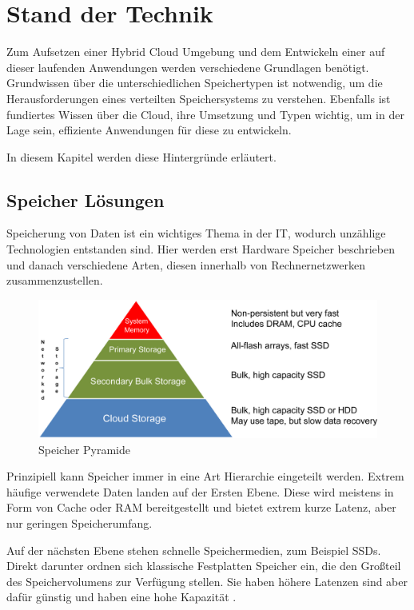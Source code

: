 \chapter{Stand der Technik}\label{ch:background}

Zum Aufsetzen einer Hybrid Cloud Umgebung und dem Entwickeln einer auf dieser laufenden Anwendungen werden verschiedene Grundlagen benötigt. Grundwissen über die unterschiedlichen Speichertypen ist notwendig, um die Herausforderungen eines verteilten Speichersystems zu verstehen. Ebenfalls ist fundiertes Wissen über die Cloud, ihre Umsetzung und Typen wichtig, um in der Lage sein, effiziente Anwendungen für diese zu entwickeln.

In diesem Kapitel werden diese Hintergründe erläutert.

\section{Speicher Lösungen} \label{sec:storage}
Speicherung von Daten ist ein wichtiges Thema in der IT, wodurch unzählige Technologien entstanden sind. Hier werden erst Hardware Speicher beschrieben und danach verschiedene Arten, diesen innerhalb von Rechnernetzwerken zusammenzustellen.

\begin{figure}[hbt]
	\centering
	\includegraphics[scale=0.75]{images/storage-pyramide}
	\caption{Speicher Pyramide \parencite{kaufmann.2016}}
	\label{fig:storagepyramide}
\end{figure}

Prinzipiell kann Speicher immer in eine Art Hierarchie eingeteilt werden. Extrem häufige verwendete Daten landen auf der Ersten Ebene. Diese wird meistens in Form von Cache oder RAM bereitgestellt und bietet extrem kurze Latenz, aber nur geringen Speicherumfang.

Auf der nächsten Ebene stehen schnelle Speichermedien, zum Beispiel SSDs. Direkt darunter ordnen sich klassische Festplatten Speicher ein, die den Großteil des Speichervolumens zur Verfügung stellen. Sie haben höhere Latenzen sind aber dafür günstig und haben eine hohe Kapazität \parencite[Kap. 2, What is Computer Storage?]{kaufmann.2016}.

